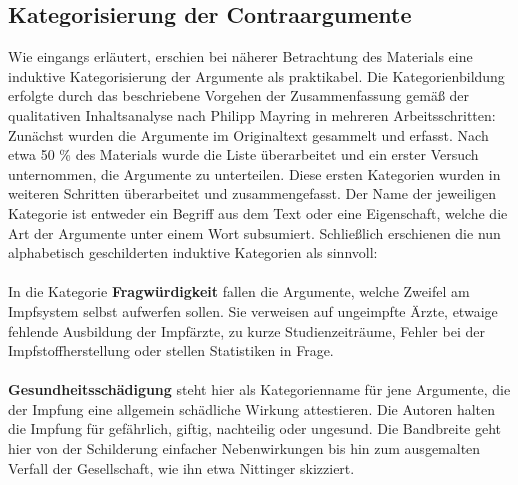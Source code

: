 \documentclass[
    a4paper,
    12pt,
    hyphens,
    chapterprefix=true,
    headheight=33pt,
    footheight=29pt,
    headings=optiontohead,
]{scrartcl}
\begin{document}
\subsection{Kategorisierung der Contraargumente}
Wie eingangs erläutert, erschien bei näherer Betrachtung des Materials eine induktive Kategorisierung der Argumente als praktikabel. Die Kategorienbildung erfolgte durch das beschriebene Vorgehen der Zusammenfassung gemäß der qualitativen Inhaltsanalyse nach  Philipp Mayring in mehreren Arbeitsschritten: Zunächst wurden die Argumente im Originaltext gesammelt und erfasst. Nach etwa 50 \% des Materials wurde die Liste überarbeitet und ein erster Versuch unternommen, die Argumente zu unterteilen. Diese ersten Kategorien wurden in weiteren Schritten überarbeitet und zusammengefasst. Der Name der jeweiligen Kategorie ist entweder ein Begriff aus dem Text oder eine Eigenschaft, welche die Art der Argumente unter einem Wort subsumiert. Schließlich erschienen die nun alphabetisch geschilderten induktive Kategorien als sinnvoll:\\
\\
In die Kategorie \textbf{Fragwürdigkeit} fallen die Argumente, welche Zweifel am Impfsystem selbst aufwerfen sollen. Sie verweisen auf ungeimpfte Ärzte, etwaige fehlende Ausbildung der Impfärzte, zu kurze Studienzeiträume, Fehler bei der Impfstoffherstellung oder stellen Statistiken in Frage.\\
\\
\textbf{Gesundheitsschädigung} steht hier als Kategorienname für jene Argumente, die der Impfung eine allgemein schädliche Wirkung attestieren. Die Autoren halten die Impfung für gefährlich, giftig, nachteilig oder ungesund. Die Bandbreite geht hier von der Schilderung einfacher Nebenwirkungen bis hin zum ausgemalten Verfall der Gesellschaft, wie ihn etwa Nittinger skizziert.\\
\end{document}

